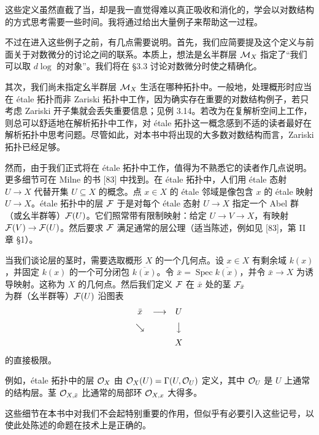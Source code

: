 这些定义虽然直截了当，却是我一直觉得难以真正吸收和消化的，学会以对数结构的方式思考需要一些时间。我将通过给出大量例子来帮助这一过程。

不过在进入这些例子之前，有几点需要说明。首先，我们应简要提及这个定义与前面关于对数微分的讨论之间的联系。本质上，想法是幺半群层 $\mathcal{M}_X$ 指定了“我们可以取 $d\log$ 的对象”。我们将在 §3.3 讨论对数微分时使之精确化。

其次，我们尚未指定幺半群层 $\mathcal{M}_X$ 生活在哪种拓扑中。一般地，处理概形时应当在 étale 拓扑而非 Zariski 拓扑中工作，因为确实存在重要的对数结构例子，若只考虑 Zariski 开子集就会丢失重要信息；见例 3.14。若改为在复解析空间上工作，则总可以舒适地在解析拓扑中工作，对 étale 拓扑这一概念感到不适的读者最好在解析拓扑中思考问题。尽管如此，对本书中将出现的大多数对数结构而言，Zariski 拓扑已经足够。

然而，由于我们正式将在 étale 拓扑中工作，值得为不熟悉它的读者作几点说明。更多细节可在 Milne 的书 [83] 中找到。在 étale 拓扑中，人们用 étale 态射 $U\to X$ 代替开集 $U\subseteq X$ 的概念。点 $x\in X$ 的 étale 邻域是像包含 $x$ 的 étale 映射 $U\to X$。étale 拓扑中的层 $\mathcal{F}$ 于是对每个 étale 态射 $U\to X$ 指定一个 Abel 群（或幺半群等）$\mathcal{F}(U)$。它们照常带有限制映射：给定 $U\to V\to X$，有映射 $\mathcal{F}(V)\to\mathcal{F}(U)$。然后要求 $\mathcal{F}$ 满足通常的层公理（适当陈述，例如见 [83]，第 II 章 §1）。

当我们谈论层的茎时，需要选取概形 $X$ 的一个几何点。设 $x\in X$ 有剩余域 $k(x)$，并固定 $k(x)$ 的一个可分闭包 $\overline{k(x)}$。令 $\bar x=\operatorname{Spec}\overline{k(x)}$，并令 $\bar x\to X$ 为诱导映射。这称为 $X$ 的几何点。然后我们定义 $\mathcal{F}$ 在 $\bar x$ 处的茎 $\mathcal{F}_{\bar x}$ 为群（幺半群等）$\mathcal{F}(U)$ 沿图表
\[
  \begin{array}{ccc}
    \bar x & \longrightarrow & U\\[6pt]
    \searrow & & \big\downarrow\\[6pt]
    & & X
  \end{array}
\]
的直接极限。

例如，étale 拓扑中的层 $\mathcal{O}_X$ 由 $\mathcal{O}_X(U)=\Gamma(U,\mathcal{O}_U)$ 定义，其中 $\mathcal{O}_U$ 是 $U$ 上通常的结构层。茎 $\mathcal{O}_{X,\bar x}$ 比通常的局部环 $\mathcal{O}_{X,x}$ 大得多。

这些细节在本书中对我们不会起特别重要的作用，但似乎有必要引入这些记号，以使此处陈述的命题在技术上是正确的。

